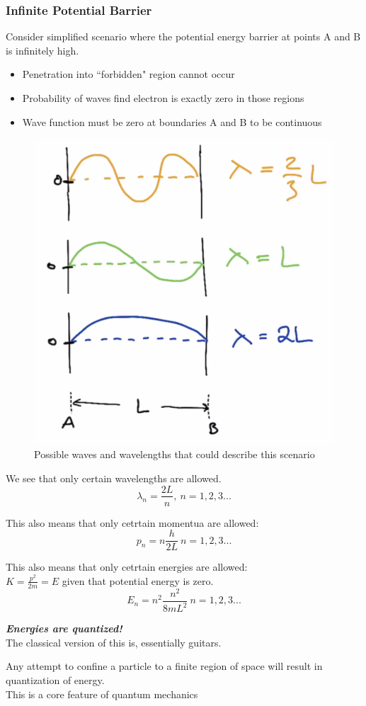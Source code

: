 \documentclass[class=article,crop=false]{standalone}
\begin{document}
\subsubsection{Infinite Potential Barrier}
Consider simplified scenario where the potential energy barrier at points A and B is infinitely high. 
\begin{itemize}
	\item Penetration into ``forbidden" region cannot occur
	\item Probability of waves find electron is exactly zero in those regions
	\item Wave function must be zero at boundaries A and B to be continuous
\end{itemize}


\begin{figure}[h!]
	\centering
	\includegraphics[width=.4\linewidth]{./Images/possible_waves.png}
	\caption{Possible waves and wavelengths that could describe this scenario}
\end{figure}

We see that only certain wavelengths are allowed.
$$ \lambda_n = \frac{2L}{n},\ n = 1,2,3... $$

This also means that only cetrtain momentua are allowed:
$$ p_n = n \frac{h}{2L}\ n = 1,2,3... $$

This also means that only cetrtain energies are allowed: \\
$ K = \frac{p^2}{2m} = E $ given that potential energy is zero.
$$ E_n = n^2 \frac{n^2}{8mL^2}\ n=1,2,3... $$

\emph{\textbf{Energies are quantized!}} \\

The classical version of this is, essentially guitars. \\

\begin{result}
	Any attempt to confine a particle to a finite region of space will result in quantization of energy.\\

	This is a core feature of quantum mechanics
\end{result}
\end{document}
